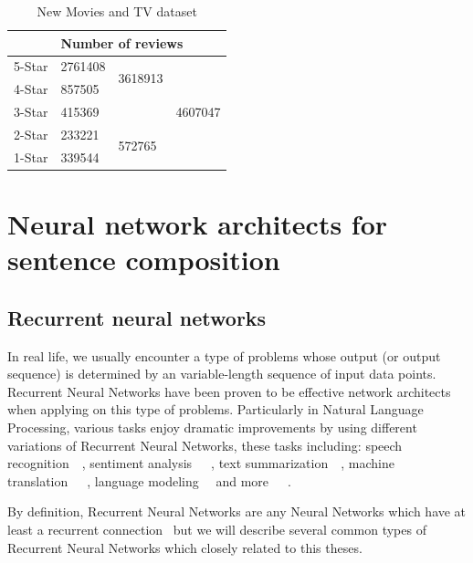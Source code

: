 \begin{table}[H]
    \centering
    \caption{New Movies and TV dataset}
    \label{table:moviereview}
    \begin{tabular}{@{}lllc@{}}
        \toprule
        & \multicolumn{3}{l}{Number of reviews}                         \\ \midrule
        5-Star & 2761408 & \multirow{2}{*}{3618913} & \multirow{5}{*}{4607047} \\ \cmidrule(r){1-2}
        4-Star & 857505  &                          &                          \\ \cmidrule(r){1-3}
        3-Star & \multicolumn{2}{l}{415369}         &                          \\ \cmidrule(r){1-3}
        2-Star & 233221  & \multirow{2}{*}{572765}  &                          \\ \cmidrule(r){1-2}
        1-Star & 339544  &                          &                          \\ \bottomrule
    \end{tabular}
\end{table}


\section{Neural network architects for sentence composition}\label{sec:composer}
\subsection{Recurrent neural networks}\label{sec:RNN}
In real life, we usually encounter a type of problems whose output (or output sequence) is determined by an variable-length sequence of input data points. 
Recurrent Neural Networks have been proven to be effective network architects when applying on this type of problems.  
Particularly in Natural Language Processing, various tasks enjoy dramatic improvements by using different variations of Recurrent Neural Networks, these tasks including:  speech recognition~\cite{speech-lstm}~\cite{MiaoGM15}, sentiment analysis~\cite{treeLSTM}~\cite{cnn-rnn}~\cite{attention-gru}, text summarization~\cite{RushCW15}~\cite{NallapatiXZ16}, machine translation~\cite{FiratCB16}~\cite{SutskeverVL14}~\cite{BritzGLL17}, language modeling~\cite{mikolov-nlm}~\cite{JozefowiczVSSW16} and more~\cite{deep-nlp}~\cite{Schmidhuber14}~\cite{deeplearning-book}.

By definition, Recurrent Neural Networks are any Neural Networks which have at least a recurrent connection~\cite{rnn-def} but we will describe several common types of Recurrent Neural Networks which closely related to this theses.


